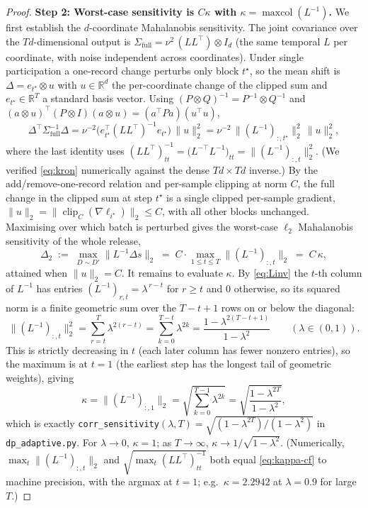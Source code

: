 \begin{proof}
\medskip
\noindent\textbf{Step 2: Worst-case sensitivity is $C\kappa$ with $\kappa=\operatorname{maxcol}(L^{-1})$.}
We first establish the $d$-coordinate Mahalanobis sensitivity. The joint covariance over the
$Td$-dimensional output is $\Sigma_{\mathrm{full}}=\nu^2\,(LL^\top)\otimes I_d$ (the same temporal $L$
per coordinate, with noise independent across coordinates). Under single participation a one-record
change perturbs only block $t^\star$, so the mean shift is $\Delta=e_{t^\star}\otimes u$ with
$u\in\mathbb R^d$ the per-coordinate change of the clipped sum and $e_{t^\star}\in\mathbb R^T$ a
standard basis vector. Using $(P\otimes Q)^{-1}=P^{-1}\otimes Q^{-1}$ and
$(a\otimes u)^\top(P\otimes I)(a\otimes u)=(a^\top P a)(u^\top u)$,
\begin{equation}
\Delta^\top\Sigma_{\mathrm{full}}^{-1}\Delta
=\nu^{-2}\big(e_{t^\star}^\top(LL^\top)^{-1}e_{t^\star}\big)\,\|u\|_2^2
=\nu^{-2}\,\big\|(L^{-1})_{:,t^\star}\big\|_2^2\,\|u\|_2^2,
\label{eq:kron}
\end{equation}
where the last identity uses $(LL^\top)^{-1}_{tt}=\big(L^{-\top}L^{-1}\big)_{tt}=\|(L^{-1})_{:,t}\|_2^2$.
(We verified \eqref{eq:kron} numerically against the dense $Td\times Td$ inverse.) By the
add/remove-one-record relation and per-sample clipping at norm $C$, the full change in the clipped sum
at step $t^\star$ is a single clipped per-sample gradient, $\|u\|_2=\|\operatorname{clip}_C(\nabla\ell_{i^\star})\|_2\le C$,
with all other blocks unchanged. Maximising over which batch is perturbed gives the worst-case
$\ell_2$ Mahalanobis sensitivity of the whole release,
\begin{equation}
\Delta_2 \;:=\; \max_{D\sim D'}\big\|L^{-1}\Delta s\big\|_2
\;=\; C\cdot \max_{1\le t\le T}\big\|(L^{-1})_{:,t}\big\|_2
\;=\; C\,\kappa ,
\label{eq:sens}
\end{equation}
attained when $\|u\|_2=C$. It remains to evaluate $\kappa$. By \eqref{eq:Linv} the $t$-th column of
$L^{-1}$ has entries $(L^{-1})_{r,t}=\lambda^{\,r-t}$ for $r\ge t$ and $0$ otherwise, so its squared
norm is a finite geometric sum over the $T-t+1$ rows on or below the diagonal:
\begin{equation}
\big\|(L^{-1})_{:,t}\big\|_2^2=\sum_{r=t}^{T}\lambda^{2(r-t)}=\sum_{k=0}^{T-t}\lambda^{2k}
=\frac{1-\lambda^{2(T-t+1)}}{1-\lambda^{2}}\qquad(\lambda\in(0,1)).
\label{eq:colnorm}
\end{equation}
This is strictly decreasing in $t$ (each later column has fewer nonzero entries), so the maximum is at
$t=1$ (the earliest step has the longest tail of geometric weights), giving
\begin{equation}
\kappa=\big\|(L^{-1})_{:,1}\big\|_2=\sqrt{\sum_{k=0}^{T-1}\lambda^{2k}}
=\sqrt{\frac{1-\lambda^{2T}}{1-\lambda^{2}}},
\label{eq:kappa-cf}
\end{equation}
which is exactly \texttt{corr\_sensitivity}$(\lambda,T)=\sqrt{(1-\lambda^{2T})/(1-\lambda^2)}$ in
\texttt{dp\_adaptive.py}. For $\lambda\to0$, $\kappa=1$; as $T\to\infty$, $\kappa\to1/\sqrt{1-\lambda^2}$.
(Numerically, $\max_t\|(L^{-1})_{:,t}\|_2$ and $\sqrt{\max_t(LL^\top)^{-1}_{tt}}$ both equal
\eqref{eq:kappa-cf} to machine precision, with the argmax at $t=1$; e.g.\ $\kappa=2.2942$ at
$\lambda=0.9$ for large $T$.)


\end{proof}
